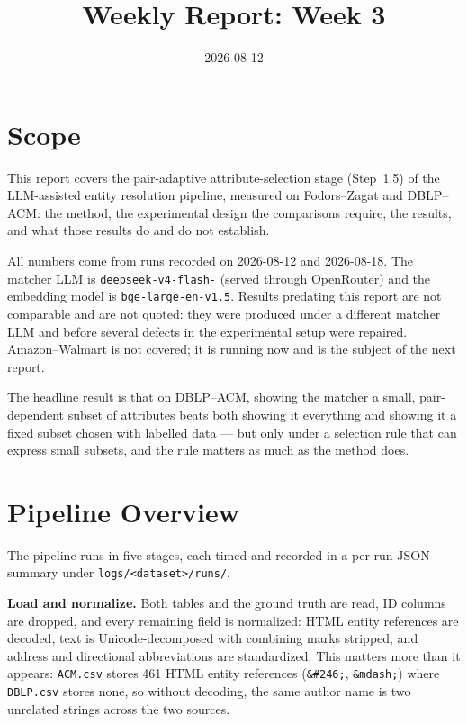 \documentclass[11pt]{article}
\title{Weekly Report: Week 3}
\author{}
\date{2026-08-12}
\begin{document}
\maketitle

\section{Scope}

This report covers the pair-adaptive attribute-selection stage (Step~1.5) of the
LLM-assisted entity resolution pipeline, measured on Fodors--Zagat and DBLP--ACM: the
method, the experimental design the comparisons require, the results, and what those
results do and do not establish.

All numbers come from runs recorded on 2026-08-12 and 2026-08-18. The matcher LLM is
\texttt{deepseek-\allowbreak v4-\allowbreak flash-} (served through
OpenRouter) and the embedding model is
\texttt{bge-\allowbreak large-\allowbreak en-\allowbreak v1.5}. Results predating this
report are not comparable and are not quoted: they were produced under a different matcher
LLM and before several defects in the experimental setup were repaired. Amazon--Walmart is
not covered; it is running now and is the subject of the next report.

The headline result is that on DBLP--ACM, showing the matcher a small, pair-dependent
subset of attributes beats both showing it everything and showing it a fixed subset chosen
with labelled data --- but only under a selection rule that can express small subsets, and
the rule matters as much as the method does.

\section{Pipeline Overview}

The pipeline runs in five stages, each timed and recorded in a per-run JSON summary under
\texttt{logs/<dataset>/runs/}.

\textbf{Load and normalize.} Both tables and the ground truth are read, ID columns are
dropped, and every remaining field is normalized: HTML entity references are decoded, text
is Unicode-decomposed with combining marks stripped, and address and directional
abbreviations are standardized. This matters more than it appears: \texttt{ACM.csv} stores
461 HTML entity references (\texttt{\&\#246;}, \texttt{\&mdash;}) where \texttt{DBLP.csv}
stores none, so without decoding, the same author name is two unrelated strings across the
two sources.
\end{document}
